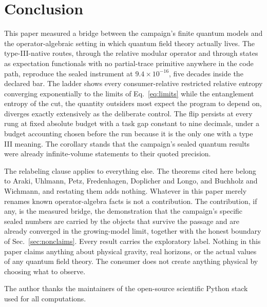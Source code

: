 \documentclass[aps,prd,reprint,nofootinbib,longbibliography]{revtex4-2}
\begin{document}
\section{Conclusion}
\label{sec:conclusion}

This paper measured a bridge between the campaign's finite quantum models
and the operator-algebraic setting in which quantum field theory actually
lives.  The type-III-native routes, through the relative modular operator
and through states as expectation functionals with no partial-trace
primitive anywhere in the code path, reproduce the sealed instrument at
$9.4\times 10^{-16}$, five decades inside the declared bar.  The ladder
shows every consumer-relative restricted relative entropy converging
exponentially to the limits of Eq.~\eqref{eq:limits} while the
entanglement entropy of the cut, the quantity outsiders most expect the
program to depend on, diverges exactly extensively as the deliberate
control.  The flip persists at every rung at fixed absolute budget with a
task gap constant to nine decimals, under a budget accounting chosen
before the run because it is the only one with a type III meaning.  The
corollary stands that the campaign's sealed quantum results were already
infinite-volume statements to their quoted precision.

The relabeling clause applies to everything else.  The theorems cited
here belong to Araki, Uhlmann, Petz, Fredenhagen, Doplicher and Longo,
and Buchholz and Wichmann, and restating them adds nothing.  Whatever in
this paper merely renames known operator-algebra facts is not a
contribution.  The contribution, if any, is the measured bridge, the
demonstration that the campaign's specific sealed numbers are carried by
the objects that survive the passage and are already converged in the
growing-model limit, together with the honest boundary of
Sec.~\ref{sec:nonclaims}.  Every result carries the exploratory label.
Nothing in this paper claims anything about physical gravity, real
horizons, or the actual values of any quantum field theory.  The consumer
does not create anything physical by choosing what to observe.

\begin{acknowledgments}
The author thanks the maintainers of the open-source scientific Python
stack used for all computations.
\end{acknowledgments}
\end{document}
